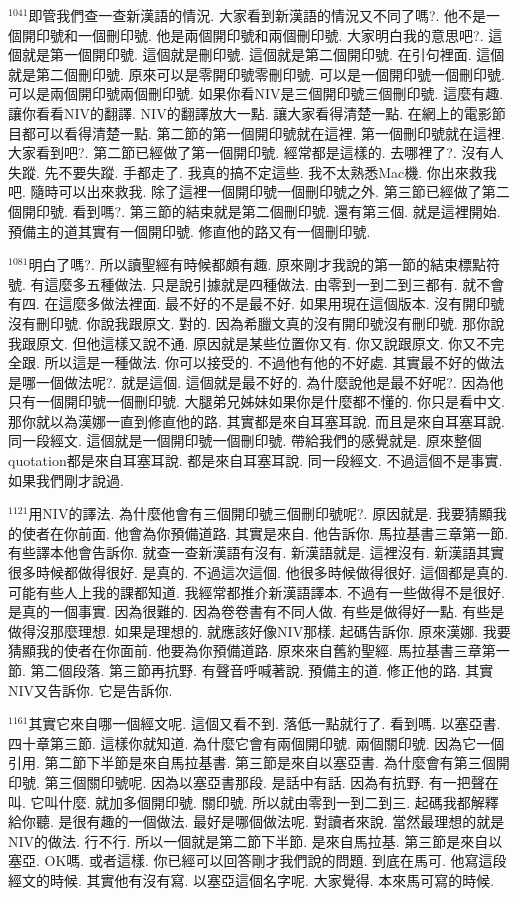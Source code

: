 \documentclass{book}
\begin{document}
$^{1041}$即管我們查一查新漢語的情況.
大家看到新漢語的情況又不同了嗎?.
他不是一個開印號和一個刪印號.
他是兩個開印號和兩個刪印號.
大家明白我的意思吧?.
這個就是第一個開印號.
這個就是刪印號.
這個就是第二個開印號.
在引句裡面.
這個就是第二個刪印號.
原來可以是零開印號零刪印號.
可以是一個開印號一個刪印號.
可以是兩個開印號兩個刪印號.
如果你看NIV是三個開印號三個刪印號.
這麼有趣.
讓你看看NIV的翻譯.
NIV的翻譯放大一點.
讓大家看得清楚一點.
在網上的電影節目都可以看得清楚一點.
第二節的第一個開印號就在這裡.
第一個刪印號就在這裡.
大家看到吧?.
第二節已經做了第一個開印號.
經常都是這樣的.
去哪裡了?.
沒有人失蹤.
先不要失蹤.
手都走了.
我真的搞不定這些.
我不太熟悉Mac機.
你出來救我吧.
隨時可以出來救我.
除了這裡一個開印號一個刪印號之外.
第三節已經做了第二個開印號.
看到嗎?.
第三節的結束就是第二個刪印號.
還有第三個.
就是這裡開始.
預備主的道其實有一個開印號.
修直他的路又有一個刪印號.

$^{1081}$明白了嗎?.
所以讀聖經有時候都頗有趣.
原來剛才我說的第一節的結束標點符號.
有這麼多五種做法.
只是說引據就是四種做法.
由零到一到二到三都有.
就不會有四.
在這麼多做法裡面.
最不好的不是最不好.
如果用現在這個版本.
沒有開印號沒有刪印號.
你說我跟原文.
對的.
因為希臘文真的沒有開印號沒有刪印號.
那你說我跟原文.
但他這樣又說不通.
原因就是某些位置你又有.
你又說跟原文.
你又不完全跟.
所以這是一種做法.
你可以接受的.
不過他有他的不好處.
其實最不好的做法是哪一個做法呢?.
就是這個.
這個就是最不好的.
為什麼說他是最不好呢?.
因為他只有一個開印號一個刪印號.
大腿弟兄姊妹如果你是什麼都不懂的.
你只是看中文.
那你就以為漢娜一直到修直他的路.
其實都是來自耳塞耳說.
而且是來自耳塞耳說.
同一段經文.
這個就是一個開印號一個刪印號.
帶給我們的感覺就是.
原來整個quotation都是來自耳塞耳說.
都是來自耳塞耳說.
同一段經文.
不過這個不是事實.
如果我們剛才說過.

$^{1121}$用NIV的譯法.
為什麼他會有三個開印號三個刪印號呢?.
原因就是.
我要猜顯我的使者在你前面.
他會為你預備道路.
其實是來自.
他告訴你.
馬拉基書三章第一節.
有些譯本他會告訴你.
就查一查新漢語有沒有.
新漢語就是.
這裡沒有.
新漢語其實很多時候都做得很好.
是真的.
不過這次這個.
他很多時候做得很好.
這個都是真的.
可能有些人上我的課都知道.
我經常都推介新漢語譯本.
不過有一些做得不是很好.
是真的一個事實.
因為很難的.
因為卷卷書有不同人做.
有些是做得好一點.
有些是做得沒那麼理想.
如果是理想的.
就應該好像NIV那樣.
起碼告訴你.
原來漢娜.
我要猜顯我的使者在你面前.
他要為你預備道路.
原來來自舊約聖經.
馬拉基書三章第一節.
第二個段落.
第三節再抗野.
有聲音呼喊著說.
預備主的道.
修正他的路.
其實NIV又告訴你.
它是告訴你.

$^{1161}$其實它來自哪一個經文呢.
這個又看不到.
落低一點就行了.
看到嗎.
以塞亞書.
四十章第三節.
這樣你就知道.
為什麼它會有兩個開印號.
兩個關印號.
因為它一個引用.
第二節下半節是來自馬拉基書.
第三節是來自以塞亞書.
為什麼會有第三個開印號.
第三個關印號呢.
因為以塞亞書那段.
是話中有話.
因為有抗野.
有一把聲在叫.
它叫什麼.
就加多個開印號.
關印號.
所以就由零到一到二到三.
起碼我都解釋給你聽.
是很有趣的一個做法.
最好是哪個做法呢.
對讀者來說.
當然最理想的就是NIV的做法.
行不行.
所以一個就是第二節下半節.
是來自馬拉基.
第三節是來自以塞亞.
OK嗎.
或者這樣.
你已經可以回答剛才我們說的問題.
到底在馬可.
他寫這段經文的時候.
其實他有沒有寫.
以塞亞這個名字呢.
大家覺得.
本來馬可寫的時候.
\end{document}
